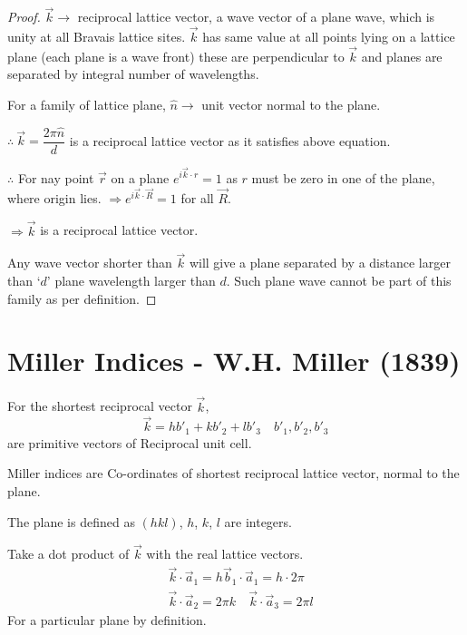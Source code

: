 \begin{proof}

$\overrightarrow{k}\to$ reciprocal lattice vector, a wave vector of a plane wave, which is unity at all Bravais lattice sites. $\overrightarrow{k}$ has same value at all points lying on a lattice plane (each plane is a wave front) these are perpendicular to $\overrightarrow{k}$ and planes are separated by integral number of wavelengths.

For a family of lattice plane, $\widehat{n}\to$ unit vector normal to the plane.

$\therefore \ \overrightarrow{k}=\dfrac{2\pi\widehat{n}}{d}$ is a reciprocal lattice vector as it satisfies above equation.

$\therefore$ For nay point $\overrightarrow{r}$ on a plane $e^{i\overrightarrow{k}\cdot r}=1$ as $r$ must be zero in one of the plane, where origin lies. $\Rightarrow e^{i\overrightarrow{k}\cdot \overrightarrow{R}}=1$ for all $\overrightarrow{R}$.

$\Rightarrow \overrightarrow{k}$ is a reciprocal lattice vector.

Any wave vector shorter than $\overrightarrow{k}$ will give a plane separated by a distance larger than `$d$' plane wavelength larger than $d$. Such plane wave cannot be part of this family as per definition.
\end{proof}

\section*{Miller Indices - W.H. Miller (1839)}

For the shortest reciprocal vector $\overrightarrow{k}$,
$$
\overrightarrow{k}=hb'_{1}+kb'_{2}+lb'_{3}\quad b'_{1},b'_{2},b'_{3}
$$
are primitive vectors of Reciprocal unit cell.

Miller indices are Co-ordinates of shortest reciprocal lattice vector, normal to the plane.

The plane is defined as $(hkl)$, $h$, $k$, $l$ are integers.

Take a dot product of $\overrightarrow{k}$ with the real lattice vectors.
\begin{align*}
& \overrightarrow{k}\cdot \overrightarrow{a}_{1}=h\overrightarrow{b}_{1}\cdot \overrightarrow{a}_{1}=h\cdot 2\pi\\
& \overrightarrow{k}\cdot \overrightarrow{a}_{2}=2\pi k\quad \overrightarrow{k}\cdot \overrightarrow{a}_{3}=2\pi l
\end{align*}
For a particular plane  by definition.

